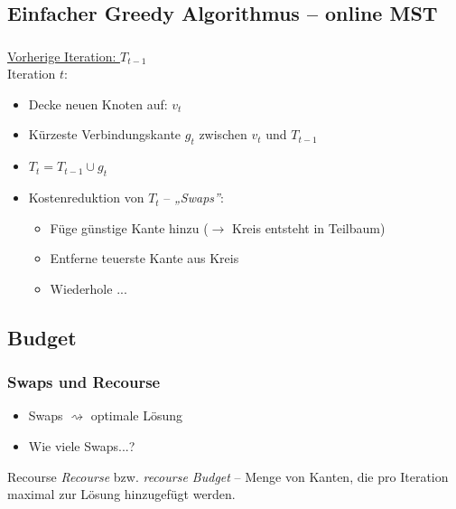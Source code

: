 \subsection{Einfacher Greedy Algorithmus -- online MST}

\begin{frame}
    \frametitle{\insertsubsection}
    \underline{Vorherige Iteration: \qquad $T_{t-1}$}\\
    \vspace{1em}
    Iteration $t$:
    \begin{itemize}
        \itemsep\setlength{.8em}
        \item Decke neuen Knoten auf: $v_t$
        \item Kürzeste Verbindungskante $g_t$ zwischen $v_t$ und $T_{t-1}$
        \item $T_t = T_{t-1} \cup g_t$
        \vspace{1em}
        \item Kostenreduktion von $T_t$ -- \textit{„Swaps”}:
        \vspace{.8em}
        \begin{itemize}
        \itemsep\setlength{.8em}
            \item Füge günstige Kante hinzu ($\rightarrow$ Kreis entsteht in Teilbaum)
            \item Entferne teuerste Kante aus Kreis
            \item Wiederhole ...
        \end{itemize}
    \end{itemize}
\end{frame}

\subsection{Budget}

\begin{frame}
    \frametitle{Swaps und Recourse}
    \begin{itemize}
        \itemsep\setlength{1em}
        \item Swaps $\rightsquigarrow$ optimale Lösung
        \item Wie viele Swaps...?
    \end{itemize}
    \vspace{1em}
    \begin{block}{Recourse}
        \vspace{1em}
        \emph{Recourse} bzw. \emph{recourse Budget} -- Menge von Kanten, die pro Iteration maximal zur Lösung hinzugefügt werden.
        \vspace{1em}
    \end{block}
\end{frame}

